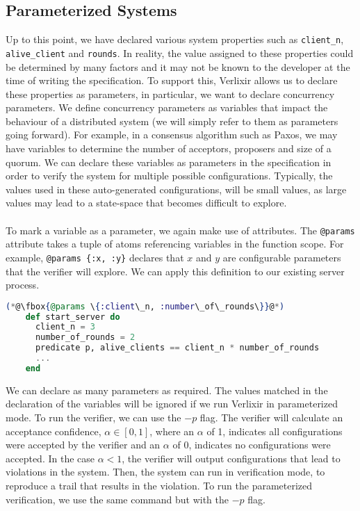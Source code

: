 \subsection{Parameterized Systems}
Up to this point, we have declared various system properties such as \texttt{client\_n}, \texttt{alive\_client} and \texttt{rounds}. In reality, the value assigned to these properties could be determined by many factors and it may not be known to the developer at the time of writing the specification. To support this, Verlixir allows us to declare these properties as parameters, in particular, we want to declare concurrency parameters. We define concurrency parameters as variables that impact the behaviour of a distributed system (we will simply refer to them as parameters going forward). For example, in a consensus algorithm such as Paxos, we may have variables to determine the number of acceptors, proposers and size of a quorum. We can declare these variables as parameters in the specification in order to verify the system for multiple possible configurations. Typically, the values used in these auto-generated configurations, will be small values, as large values may lead to a state-space that becomes difficult to explore.
\\ \\
To mark a variable as a parameter, we again make use of attributes. The \texttt{@params} attribute takes a tuple of atoms referencing variables in the function scope. For example, \texttt{@params \{:x, :y\}} declares that $x$ and $y$ are configurable parameters that the verifier will explore. We can apply this definition to our existing server process.
\begin{lstlisting}[language=Elixir, xleftmargin=.3\linewidth, caption={Example of declaring concurrency parameters in specification.}]
    (*@\fbox{@params \{:client\_n, :number\_of\_rounds\}}@*)
    def start_server do
      client_n = 3
      number_of_rounds = 2
      predicate p, alive_clients == client_n * number_of_rounds
      ...
    end
\end{lstlisting}
We can declare as many parameters as required. The values matched in the declaration of the variables will be ignored if we run Verlixir in parameterized mode. To run the verifier, we can use the $-p$ flag. The verifier will calculate an acceptance confidence, \(\alpha \in [0, 1]\), where an $\alpha$ of 1, indicates all configurations were accepted by the verifier and an $\alpha$ of 0, indicates no configurations were accepted. In the case $\alpha < 1$, the verifier will output configurations that lead to violations in the system. Then, the system can run in verification mode, to reproduce a trail that results in the violation. To run the parameterized verification, we use the same command but with the $-p$ flag.
